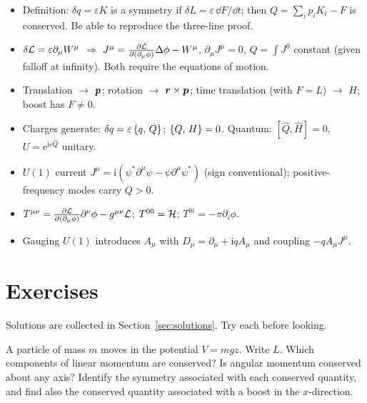 \documentclass[11pt]{article}
\newcommand{\eps}{\varepsilon}
\begin{document}
\begin{tcolorbox}[colback=yellow!5,colframe=yellow!40!black,title={Know cold},breakable]
\begin{itemize}[nosep]
  \item Definition: $\delta q=\eps K$ is a symmetry if $\delta L=\eps\,\dd F/\dd t$; then $Q=\sum_i p_iK_i-F$ is conserved. Be able to reproduce the three-line proof.
  \item $\delta\Lag=\eps\partial_\mu W^\mu$ $\Rightarrow$ $J^\mu=\frac{\partial\mathcal{L}}{\partial(\partial_\mu\phi)}\Delta\phi-W^\mu$, $\partial_\mu J^\mu=0$, $Q=\int J^0$ constant (given falloff at infinity). Both require the equations of motion.
  \item Translation $\to$ $\bm{p}$; rotation $\to$ $\bm{r}\times\bm{p}$; time translation (with $F=L$) $\to$ $H$; boost has $F\ne0$.
  \item Charges generate: $\delta q=\eps\pb{q}{Q}$; $\left\{Q,\,H\right\}=0$. Quantum: $[\hat Q,\hat H]=0$, $U=\mathrm e^{\mathrm i\eps\hat Q}$ unitary.
  \item $U(1)$ current $J^\mu=\mathrm i(\psi^*\partial^\mu\psi-\psi\partial^\mu\psi^*)$ (sign conventional); positive-frequency modes carry $Q>0$.
  \item $T^{\mu\nu}=\frac{\partial\mathcal{L}}{\partial(\partial_\mu\phi)}\partial^\nu\phi-g^{\mu\nu}\mathcal{L}$; $T^{00}=\mathcal{H}$; $T^{0i}=-\pi\partial_i\phi$.
  \item Gauging $U(1)$ introduces $A_\mu$ with $D_\mu=\partial_\mu+\mathrm iqA_\mu$ and coupling $-qA_\mu J^\mu$.
\end{itemize}
\end{tcolorbox}

\section{Exercises}

Solutions are collected in Section~\ref{sec:solutions}. Try each before looking.

\begin{exercise}\label{ex:gravity}
A particle of mass $m$ moves in the potential $V=mgz$. Write $L$. Which components of linear momentum are conserved? Is angular momentum conserved about any axis? Identify the symmetry associated with each conserved quantity, and find also the conserved quantity associated with a boost in the $x$-direction.
\end{exercise}
\end{document}
